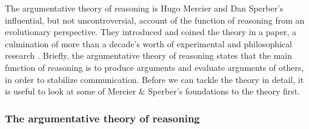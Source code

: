 The argumentative theory of reasoning is Hugo Mercier and Dan Sperber's influential, but not uncontroversial, account of the function of reasoning from an evolutionary perspective. They introduced and coined the theory in a \citeyear{MS11} paper, a culmination of more than a decade's worth of experimental and philosophical research \citep{Sperber01, Sperber10, MS09, Sperber00}.
Briefly, the argumentative theory of reasoning states that the main function of reasoning is to produce arguments and evaluate arguments of others, in order to stabilize communication.
Before we can tackle the theory in detail, it is useful to look at some of Mercier \& Sperber's foundations to the theory first.


\subsubsection{The argumentative theory of reasoning}

